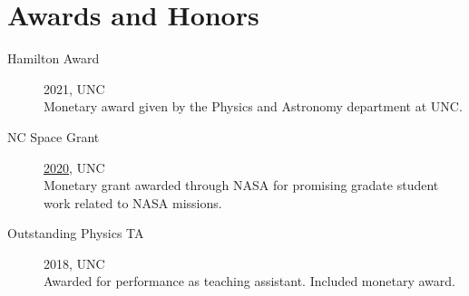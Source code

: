 \documentclass[11pt]{article}
\begin{document}


\section*{Awards and Honors}
\begin{minipage}{\textwidth}
	\begin{description}
		\item[Hamilton Award] 2021, UNC\\
			Monetary award given by the Physics and Astronomy department at UNC.
		\item[NC Space Grant] \href{https://ncspacegrant.ncsu.edu/events/2021-space-symposium/nc-space-symposium-presentations/astronomy-astrophysics/}{2020}, UNC\\
			Monetary grant awarded through NASA for promising gradate student work related to NASA missions.
		\item[Outstanding Physics TA] 2018, UNC\\
			Awarded for performance as  teaching  assistant.  Included monetary award.
	\end{description}
\end{minipage}
\end{document}
